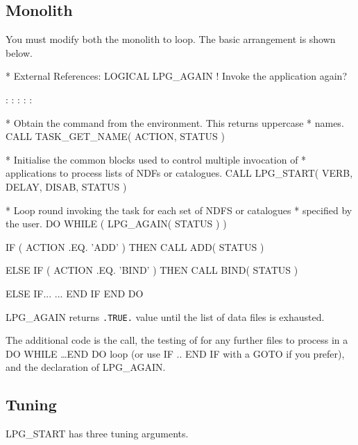 \documentclass[twoside,11pt]{starlink}
\begin{document}
\subsection{Monolith}

You must modify both the monolith to loop.  The basic arrangement is
shown below.

\begin{small}
\begin{terminalv}
*  External References:
      LOGICAL LPG_AGAIN           ! Invoke the application again?

           :           :           :           :           :

*  Obtain the command from the environment.  This returns uppercase
*  names.
      CALL TASK_GET_NAME( ACTION, STATUS )

*  Initialise the common blocks used to control multiple invocation of
*  applications to process lists of NDFs or catalogues.
      CALL LPG_START( VERB, DELAY, DISAB, STATUS )

*  Loop round invoking the task for each set of NDFS or catalogues
*  specified by the user.
      DO WHILE ( LPG_AGAIN( STATUS ) )

         IF ( ACTION .EQ. 'ADD' ) THEN
            CALL ADD( STATUS )

         ELSE IF ( ACTION .EQ. 'BIND' ) THEN
            CALL BIND( STATUS )

         ELSE IF...
            ...
         END IF
      END DO
\end{terminalv}
\end{small}

LPG\_AGAIN returns \texttt{.TRUE.} value until the list of data files is
exhausted.

The additional code is the  call, the
testing of  for any further files to
process in a DO WHILE \ldots END DO loop (or use IF .. END IF with a
GOTO if you prefer), and the declaration of LPG\_AGAIN.

\subsection{Tuning}

LPG\_START has three tuning arguments.
\end{document}
